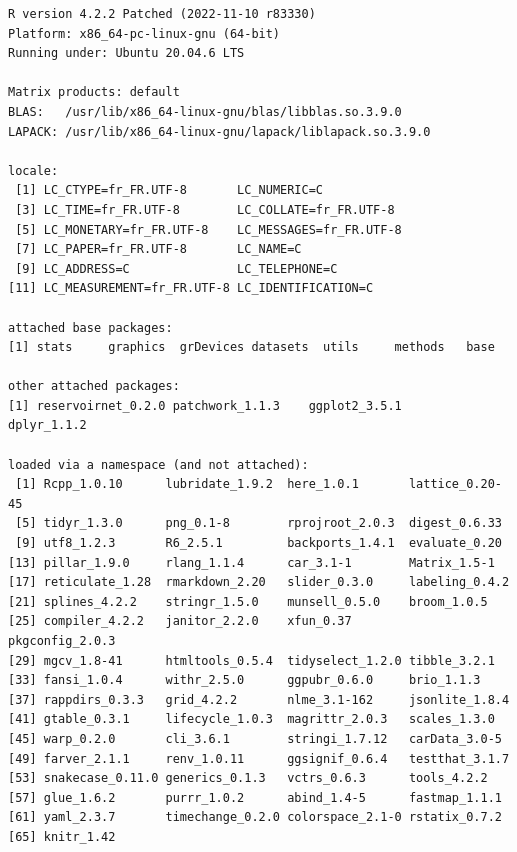 \documentclass[
  11pt,
  a4paper,
]{article}
\theoremstyle{plain}
\theoremstyle{remark}
\begin{document}
\begin{verbatim}
R version 4.2.2 Patched (2022-11-10 r83330)
Platform: x86_64-pc-linux-gnu (64-bit)
Running under: Ubuntu 20.04.6 LTS

Matrix products: default
BLAS:   /usr/lib/x86_64-linux-gnu/blas/libblas.so.3.9.0
LAPACK: /usr/lib/x86_64-linux-gnu/lapack/liblapack.so.3.9.0

locale:
 [1] LC_CTYPE=fr_FR.UTF-8       LC_NUMERIC=C              
 [3] LC_TIME=fr_FR.UTF-8        LC_COLLATE=fr_FR.UTF-8    
 [5] LC_MONETARY=fr_FR.UTF-8    LC_MESSAGES=fr_FR.UTF-8   
 [7] LC_PAPER=fr_FR.UTF-8       LC_NAME=C                 
 [9] LC_ADDRESS=C               LC_TELEPHONE=C            
[11] LC_MEASUREMENT=fr_FR.UTF-8 LC_IDENTIFICATION=C       

attached base packages:
[1] stats     graphics  grDevices datasets  utils     methods   base     

other attached packages:
[1] reservoirnet_0.2.0 patchwork_1.1.3    ggplot2_3.5.1      dplyr_1.1.2       

loaded via a namespace (and not attached):
 [1] Rcpp_1.0.10      lubridate_1.9.2  here_1.0.1       lattice_0.20-45 
 [5] tidyr_1.3.0      png_0.1-8        rprojroot_2.0.3  digest_0.6.33   
 [9] utf8_1.2.3       R6_2.5.1         backports_1.4.1  evaluate_0.20   
[13] pillar_1.9.0     rlang_1.1.4      car_3.1-1        Matrix_1.5-1    
[17] reticulate_1.28  rmarkdown_2.20   slider_0.3.0     labeling_0.4.2  
[21] splines_4.2.2    stringr_1.5.0    munsell_0.5.0    broom_1.0.5     
[25] compiler_4.2.2   janitor_2.2.0    xfun_0.37        pkgconfig_2.0.3 
[29] mgcv_1.8-41      htmltools_0.5.4  tidyselect_1.2.0 tibble_3.2.1    
[33] fansi_1.0.4      withr_2.5.0      ggpubr_0.6.0     brio_1.1.3      
[37] rappdirs_0.3.3   grid_4.2.2       nlme_3.1-162     jsonlite_1.8.4  
[41] gtable_0.3.1     lifecycle_1.0.3  magrittr_2.0.3   scales_1.3.0    
[45] warp_0.2.0       cli_3.6.1        stringi_1.7.12   carData_3.0-5   
[49] farver_2.1.1     renv_1.0.11      ggsignif_0.6.4   testthat_3.1.7  
[53] snakecase_0.11.0 generics_0.1.3   vctrs_0.6.3      tools_4.2.2     
[57] glue_1.6.2       purrr_1.0.2      abind_1.4-5      fastmap_1.1.1   
[61] yaml_2.3.7       timechange_0.2.0 colorspace_2.1-0 rstatix_0.7.2   
[65] knitr_1.42      
\end{verbatim}
\end{document}
